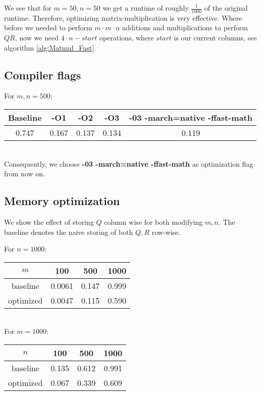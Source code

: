 \documentclass[a4paper]{scrartcl}
\begin{document}
        We see that for $m=50,n=50$ we get a runtime of roughly $\frac{1}{1000}$
        of the original runtime. Therefore, optimizing matrix-multiplication is
        very effective. Where before we needed to perform $m\cdot m \cdot n$
        additions and multiplications to perform $QR$, now we need $4 \cdot
        n-start$ operations, where $start$ is our current columns, see algorithm
        \ref{alg:Matmul_Fast}.

    \subsection{Compiler flags}\label{res:OptFLag}
        For $m,n=500$:\\
        \noindent\begin{tabular}{c|c|c|c|c}
            Baseline & -O1 & -O2 & -O3 & -03 -march=native -ffast-math\\
            \hline
            0.747 & 0.167 & 0.137 & 0.134 & 0.119\\
        \end{tabular}\\[10pt]
        Consequently, we choose \textbf{-03 -march=native -ffast-math} as
        optimization flag from now on.

    \subsection{Memory optimization}\label{res:Memory_Opt}
        We show the effect of storing $Q$ column wise for both modifying $m,n$.
        The baseline denotes the naive storing of both $Q,R$ row-wise. 
        
        For $n=1000$:\\
         \noindent\begin{tabular}{c|c|c|c}
             $m$ & 100 & 500 & 1000 \\
            \hline
            baseline & 0.0061 & 0.147 & 0.999\\
            optimized & 0.0047 & 0.115 & 0.590\\
        \end{tabular}\\[10pt]
        
        For $m=1000$:\\
        \noindent\begin{tabular}{c|c|c|c}
            $n$ & 100 & 500 & 1000 \\
            \hline
            baseline & 0.135 & 0.612 & 0.991\\
            optimized & 0.067 & 0.339 & 0.609\\
        \end{tabular}\\[10pt]
        
\end{document}
